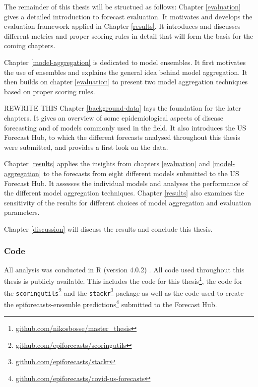 \documentclass[
]{book}
\begin{document}
The remainder of this thesis will be structued as follows: Chapter \ref{evaluation} gives a detailed introduction to forecast evaluation. It motivates and develops the evaluation framework applied in Chapter \ref{results}. It introduces and discusses different metrics and proper scoring rules in detail that will form the basis for the coming chapters.

Chapter \ref{model-aggregation} is dedicated to model ensembles. It first motivates the use of ensembles and explains the general idea behind model aggregation. It then builds on chapter \ref{evaluation} to present two model aggregation techniques based on proper scoring rules.

REWRITE THIS
Chapter \ref{background-data} lays the foundation for the later chapters. It gives an overview of some epidemiological aspects of disease forecasting and of models commonly used in the field. It also introduces the US Forecast Hub, to which the different forecasts analysed throughout this thesis were submitted, and provides a first look on the data.

Chapter \ref{results} applies the insights from chapters \ref{evaluation} and \ref{model-aggregation} to the forecasts from eight different models submitted to the US Forecast Hub. It assesses the individual models and analyses the performance of the different model aggregation techniques. Chapter \ref{results} also examines the sensitivity of the results for different choices of model aggregation and evaluation parameters.

Chapter \ref{discussion} will discuss the results and conclude this thesis.

\hypertarget{code}{%
\subsubsection*{Code}\label{code}}

All analysis was conducted in R (version 4.0.2) \citep{R-base}. All code used throughout this thesis is publicly available. This includes the code for this thesis\footnote{\href{https://github.com/nikosbosse/master_thesis}{github.com/nikosbosse/master\_thesis}}, the code for the \texttt{scoringutils}\footnote{\href{https://github.com/epiforecasts/scoringutils}{github.com/epiforecasts/scoringutils}} and the \texttt{stackr}\footnote{\href{https://github.com/epiforecasts/stackr}{github.com/epiforecasts/stackr}} package as well as the code used to create the epiforecasts-ensemble predictions\footnote{\href{https://github.com/epiforecasts/covid-us-forecasts}{github.com/epiforecasts/covid-us-forecasts}} submitted to the Forecast Hub.
\end{document}
